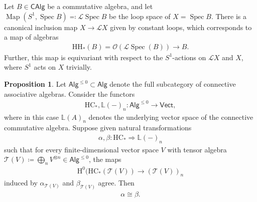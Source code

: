 \documentclass{article}
\numberwithin{equation}{section}
\theoremstyle{quest}
\theoremstyle{definition}
\newtheorem{prop}[thm]{Proposition}
\theoremstyle{remark}
\DeclareMathOperator{\Spec}{Spec}
\DeclareMathOperator{\Map}{Map}
\begin{document}
Let $B\in\mathsf{CAlg}$ be a commutative algebra, and let $\Map(S^1,\Spec B)\eqcolon \mathscr{L}\Spec B$ be the loop space of $X=\Spec B$. There is a canonical inclusion map $X\to \mathscr{L}X$ given by constant loops, which corresponds to a map of algebras
\begin{align}\label{eq:const-loops}
	\mathrm H\mathrm H_*(B)=\mathscr{O}(\mathscr{L}\Spec (B))\to B.
\end{align} 
Further, this map is equivariant with respect to the $S^1$-actions on $\mathscr{L}X$ and $X$, where $S^1$ acts on $X$ trivially.
\begin{prop}\label{prop:natural-transf-agree-on-truncations}
	Let $\mathsf{Alg}^{\le 0}\subset \mathsf{Alg}$ denote the full subcategory of connective associative algebras. Consider the functors
	\begin{align*}
		\mathrm {HC}_*,\mathbb{L}(-)_n: \mathsf{Alg}^{\le 0}\to \mathsf{Vect},
	\end{align*} 
	where in this case $\mathbb{L}(A)_n$ denotes the underlying vector space of the connective commutative algebra. Suppose given natural transformations
	\begin{align*}
		\alpha,\beta:\mathrm{HC}_*\Rightarrow  \mathbb{L}(-)_n
	\end{align*} 
	such that for every finite-dimensional vector space $V$ with tensor algebra $\mathscr{T}(V)\coloneqq \bigoplus_n V^{\otimes n}\in \mathsf{Alg}^{\le 0}$, the maps
	\begin{align*}
		\mathrm{H}^0(\mathrm{HC}_*(\mathscr{T}(V))\to (\mathscr{T}(V))_n
	\end{align*} 
	induced by $\alpha_{\mathscr{T}(V)}$ and $\beta_{\mathscr{T}(V)}$ agree. Then 
	\begin{align*}
		\alpha\cong\beta.
	\end{align*} 
\end{prop} 
\end{document}
